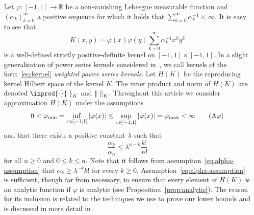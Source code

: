 \documentclass{mcom-l}
\numberwithin{equation}{section}
\numberwithin{theorem}{section} %
\newcommand{\R}{\mathbb{R}} %
\begin{document}
Let $\varphi \colon [-1, 1] \to \R$ be a non-vanishing Lebesgue measurable function and $(\alpha_k)_{k = 0}^\infty$ a positive sequence for which it holds that $\sum_{k=0}^\infty \alpha_k^{-1} < \infty$.
It is easy to see that
\begin{equation} \label{eq:kernel}
  K(x, y) = \varphi(x) \varphi(y) \sum_{k=0}^\infty \alpha_k^{-1} x^k y^k
\end{equation}
is a well-defined strictly positive-definite kernel on $[-1, 1] \times [-1, 1]$.
In a slight generalisation of power series kernels considered in~\cite{Zwicknagl2009, ZwicknaglSchaback2013}, we call kernels of the form~\eqref{eq:kernel} \emph{weighted power series kernels}.
Let $H(K)$ be the reproducing kernel Hilbert space of the kernel $K$.
The inner product and norm of $H(K)$ are denoted $\inprod{\cdot}{\cdot}_K$ and $\norm[0]{\cdot}_K$.
Throughout this article we consider approximation $H(K)$ under the assumptions
\begin{equation} \label{eq:phi-assumption}
  0 < \varphi_\textup{min} = \inf_{x \in [-1, 1]} \abs[0]{\varphi(x)} \leq \sup_{x \in [-1, 1]} \abs[0]{\varphi(x)} = \varphi_\textup{max} < \infty \tag{A$\varphi$}
\end{equation}
and that there exists a positive constant $\lambda$ such that
\begin{equation} \label{eq:alpha-assumption}
  \frac{\alpha_{k}}{\alpha_n} \leq \lambda^{n-k} \frac{k!}{n!} \tag{A$\alpha$}
\end{equation}
for all $n \geq 0$ and $0 \leq k \leq n$.
Note that it follows from assumption~\eqref{eq:alpha-assumption} that $\alpha_k \geq \lambda^{-k} k!$ for every $k \geq 0$.
Assumption~\eqref{eq:alpha-assumption} is sufficient, though far from necessary, to ensure that every element of $H(K)$ is an analytic function if $\varphi$ is analytic (see Proposition~\ref{prop:analytic}).
The reason for its inclusion is related to the techniques we use to prove our lower bounds and is discussed in more detail in .
\end{document}
